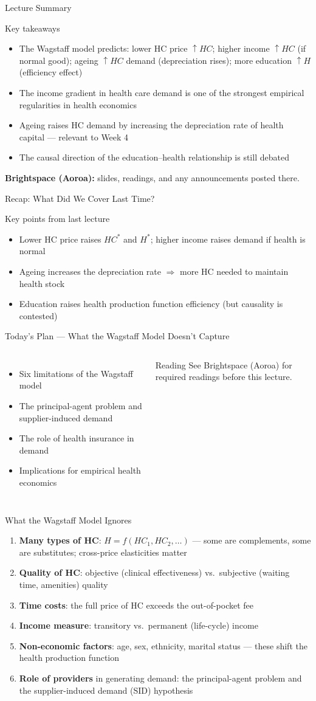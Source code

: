 \documentclass[aspectratio=169, 12pt]{beamer}
\newcommand{\recapslide}[1]{%
  \begin{frame}{Recap: What Did We Cover Last Time?}
    \begin{block}{Key points from last lecture}
      \begin{itemize}#1\end{itemize}
    \end{block}
  \end{frame}}
\newcommand{\planslide}[2]{%
  \begin{frame}{Today's Plan — #1}
    \begin{columns}
      \column{0.6\textwidth}
      \begin{itemize}#2\end{itemize}
      \column{0.38\textwidth}
      \begin{alertblock}{Reading}
        \footnotesize See Brightspace (Aoroa) for required readings before this lecture.
      \end{alertblock}
    \end{columns}
  \end{frame}}
\newcommand{\summaryside}[1]{%
  \begin{frame}{Lecture Summary}
    \begin{exampleblock}{Key takeaways}
      \begin{itemize}#1\end{itemize}
    \end{exampleblock}
    \vspace{0.5em}
    {\footnotesize\textcolor{OtagoGold}{\textbf{Brightspace (Aoroa):}} slides, readings, and any announcements posted there.}
  \end{frame}}
\begin{document}
\summaryside{
  \item The Wagstaff model predicts: lower HC price $\uparrow HC$; higher income $\uparrow HC$ (if normal good); ageing $\uparrow HC$ demand (depreciation rises); more education $\uparrow H$ (efficiency effect)
  \item The income gradient in health care demand is one of the strongest empirical regularities in health economics
  \item Ageing raises HC demand by increasing the depreciation rate of health capital --- relevant to Week 4
  \item The causal direction of the education--health relationship is still debated
}


\recapslide{
  \item Lower HC price raises $HC^*$ and $H^*$; higher income raises demand if health is normal
  \item Ageing increases the depreciation rate $\Rightarrow$ more HC needed to maintain health stock
  \item Education raises health production function efficiency (but causality is contested)
}

\planslide{What the Wagstaff Model Doesn't Capture}{
  \item Six limitations of the Wagstaff model
  \item The principal-agent problem and supplier-induced demand
  \item The role of health insurance in demand
  \item Implications for empirical health economics
}

\begin{frame}{What the Wagstaff Model Ignores}
  \begin{enumerate}
    \item \textbf{Many types of HC}: $H = f(HC_1, HC_2, \ldots)$ --- some are
          complements, some are substitutes; cross-price elasticities matter
    \item \textbf{Quality of HC}: objective (clinical effectiveness) vs.\ subjective
          (waiting time, amenities) quality
    \item \textbf{Time costs}: the full price of HC exceeds the out-of-pocket fee
    \item \textbf{Income measure}: transitory vs.\ permanent (life-cycle) income
    \item \textbf{Non-economic factors}: age, sex, ethnicity, marital status --- these
          shift the health production function
    \item \textbf{Role of providers} in generating demand: the principal-agent problem
          and the supplier-induced demand (SID) hypothesis
  \end{enumerate}
\end{frame}
\end{document}
